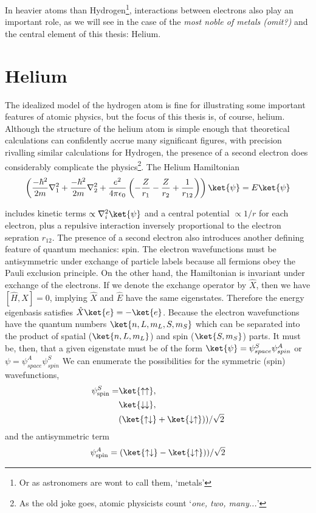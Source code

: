 	In heavier atoms than Hydrogen\footnote{Or as astronomers are wont to call them, `metals'}, interactions between electrons also play an important role, as we will see in the case of the \emph{most noble of metals (omit?)} and the central element of this thesis: Helium.
		
\section{Helium} 

	The idealized model of the hydrogen atom is fine for illustrating some important features of atomic physics, but the focus of this thesis is, of course, helium. Although the structure of the helium atom is simple enough that theoretical calculations can confidently accrue many significant figures, with precision rivalling similar calculations for Hydrogen, the presence of a second electron does considerably complicate the physics\footnote{As the old joke goes, atomic physicists count `\emph{one, two, many...}'}. The Helium Hamiltonian 
	$$
	\left(\frac{-\hbar^2}{2m}\nabla_{1}^2+\frac{-\hbar^2}{2m}\nabla_{2}^2 + \frac{e^2}{4\pi\epsilon_0}\left(-\frac{Z}{r_1}-\frac{Z}{r_2}+\frac{1}{r_{12}}\right) \right)\ket{\psi} = E \ket{\psi}
	$$

	\noindent includes kinetic terms $\propto\nabla_i^2\ket{\psi}$ and a central potential $\propto 1/r$ for each electron, plus a repulsive interaction inversely proportional to the electron sepration $r_{12}$. The presence of a second electron also introduces another defining feature of quantum mechanics: spin. The electron wavefunctions must be antisymmetric under exchange of particle labels because all fermions obey the Pauli exclusion principle. On the other hand, the Hamiltonian is invariant under exchange of the electrons. If we denote the exchange operator by $\hat{X}$, then we have $[\hat{H},\hat{X}] = 0$, implying $\hat{X}$ and $\hat{E}$ have the same eigenstates. Therefore the energy eigenbasis satisfies $\hat{X}\ket{e} = -\ket{e}$. Because the electron wavefunctions have the quantum numbers $\ket{n,L,m_L,S,m_S}$ which can be separated into the product of spatial ($\ket{n,L,m_L}$) and spin ($\ket{S,m_S}$) parts. It must be, then, that a given eigenstate must be of the form $\ket{\psi} =  \psi^{S}_{space}\psi^{A}_{spin}$ or $\psi=\psi^{A}_{space}\psi^{S}_{spin}$
	We can enumerate the possibilities for the symmetric (spin) wavefunctions, 
	\begin{align}
	\psi^S_\text{spin} =& \ket{\uparrow\uparrow},\\
		&\ket{\downarrow\downarrow},\\
		&(\ket{\uparrow\downarrow}+\ket{\downarrow\uparrow}))/\sqrt{2}
	\end{align}
	 and the antisymmetric term
	\begin{equation}
	\psi^A_\text{spin} = (\ket{\uparrow\downarrow}-\ket{\downarrow\uparrow}))/\sqrt{2}
	\end{equation}

